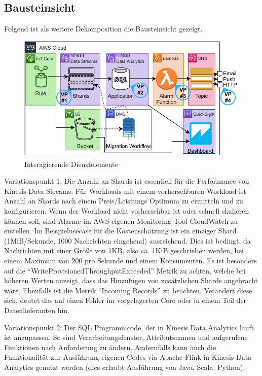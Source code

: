 \subsection{Bausteinsicht}
Folgend ist als weitere Dekomposition die Bausteinsicht gezeigt.
\begin{figure}[H]
\centering
\includegraphics[width=\textwidth]{graphics/Echtzeit-RA-Elements.pdf}
\caption{Interagierende Dienstelemente}
\label{abb:ElementeEchtzeitRA}
\end{figure}
Variationspunkt 1: Die Anzahl an Shards ist essentiell für die Performance von Kinesis Data Streams. Für Workloads mit einem vorhersehbaren Workload ist Anzahl an Shards nach einem Preis/Leistungs Optimum zu ermitteln und zu konfigurieren. Wenn der Workload nicht vorhersehbar ist oder schnell skalieren können soll, sind Alarme im AWS eigenen Monitoring Tool CloudWatch zu erstellen. Im Beispielusecase für die Kostenschätzung ist ein einziger Shard (1MiB/Sekunde, 1000 Nachrichten eingehend) ausreichend. Dies ist bedingt, da Nachrichten mit einer Größe von 1KB, also ca. 1KiB geschrieben werden, bei einem Maximum von 200 pro Sekunde und einem Konsumenten. Es ist besonders auf die \enquote{WriteProvisionedThroughputExceeded} Metrik zu achten, welche bei höheren Werten anzeigt, dass das Hinzufügen von zusätzlichen Shards angebracht wäre. Ebenfalls ist die Metrik \enquote{Incoming Records} zu beachten. Verändert diese sich, deutet das auf einen Fehler im vorgelagerten \AWSIOT{} Core oder in einem Teil der Datenlieferanten hin.


Variationspunkt 2: Der \ac{SQL} Programmcode, der in Kinesis Data Analytics läuft ist anzupassen. So sind Verarbeitungsfenster, Attributsnamen und aufgerufene Funktionen nach Anforderung zu ändern. Andernfalls kann auch die Funktionalität zur Ausführung eigenen Codes via Apache Flink in Kinesis Data Analytics genutzt werden (dies erlaubt Ausführung von Java, Scala, Python).

